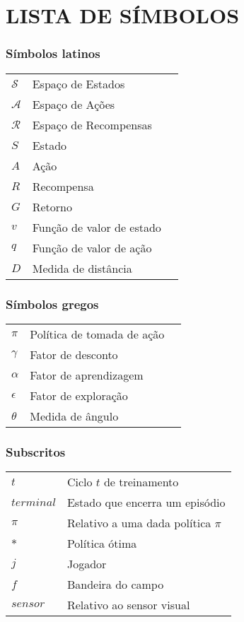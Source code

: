 




\chapter*{LISTA DE SÍMBOLOS}


\subsection*{Símbolos latinos}

\begin{tabular}{p{}p{}>{\PreserveBacklash\raggedleft}p{}}
	$\mathcal{S}$ & Espaço de Estados \tabularnewline
	$\mathcal{A}$ & Espaço de Ações \tabularnewline
	$\mathcal{R}$ & Espaço de Recompensas \tabularnewline
	$S$ & Estado \tabularnewline
	$A$ & Ação \tabularnewline
	$R$ & Recompensa \tabularnewline
	$G$ & Retorno \tabularnewline
	$v$ & Função de valor de estado \tabularnewline
	$q$ & Função de valor de ação\tabularnewline
	$D$ & Medida de distância \tabularnewline
\end{tabular}

\subsection*{Símbolos gregos}

\begin{tabular}{p{}p{}>{\PreserveBacklash\raggedleft}p{}}
$\pi$ & Política de tomada de ação \tabularnewline
$\gamma$ & Fator de desconto \tabularnewline
$\alpha$ & Fator de aprendizagem \tabularnewline
$\epsilon$ & Fator de exploração \tabularnewline
$\theta$ & Medida de ângulo \tabularnewline
\end{tabular}

\subsection*{Subscritos}

\begin{tabular}{p{}p{}}
$t$  & Ciclo $t$ de treinamento \tabularnewline
$terminal$  & Estado que encerra um episódio \tabularnewline
$\pi$	& Relativo a uma dada política $\pi$ \tabularnewline
$*$  & Política ótima \tabularnewline
$j$  & Jogador \tabularnewline
$f$  & Bandeira do campo \tabularnewline
$sensor$  & Relativo ao sensor visual \tabularnewline
\end{tabular}

